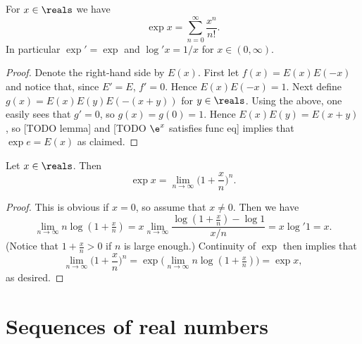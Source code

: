 \documentclass[article, a4paper, 11pt, oneside]{memoir}
\numberwithin{equation}{chapter}
\begin{document}
\begin{proposition}
    For $x \in \reals$ we have
    \begin{equation*}
        \exp x
            = \sum_{n=0}^\infty \frac{x^n}{n!}.
    \end{equation*}
    In particular $\exp' = \exp$ and $\log' x = 1/x$ for $x \in (0,\infty)$.
\end{proposition}

\begin{proof}
    Denote the right-hand side by $E(x)$. First let $f(x) = E(x)E(-x)$ and notice that, since $E' = E$, $f' = 0$. Hence $E(x)E(-x) = 1$. Next define $g(x) = E(x)E(y)E(-(x+y))$ for $y \in \reals$. Using the above, one easily sees that $g' = 0$, so $g(x) = g(0) = 1$. Hence $E(x)E(y) = E(x+y)$, so [TODO lemma] and [TODO $\e^x$ satisfies func eq] implies that $\exp e = E(x)$ as claimed.
\end{proof}


\begin{proposition}
    Let $x \in \reals$. Then
    \begin{equation*}
        \exp x
            = \lim_{n \to \infty} \biggl( 1 + \frac{x}{n} \biggr)^n.
    \end{equation*}
\end{proposition}

\begin{proof}
    This is obvious if $x = 0$, so assume that $x \neq 0$. Then we have
    \begin{equation*}
        \lim_{n \to \infty} n \log(1 + \tfrac{x}{n})
            = x \lim_{n \to \infty} \frac{\log(1 + \tfrac{x}{n}) - \log 1}{x/n}
            = x \log' 1
            = x.
    \end{equation*}
    (Notice that $1 + \tfrac{x}{n} > 0$ if $n$ is large enough.) Continuity of $\exp$ then implies that
    \begin{equation*}
        \lim_{n \to \infty} \biggl( 1 + \frac{x}{n} \biggr)^n
            = \exp \biggl( \lim_{n \to \infty} n \log(1 + \tfrac{x}{n}) \biggr)
            = \exp x,
    \end{equation*}
    as desired.
\end{proof}


\section{Sequences of real numbers}

\end{document}
